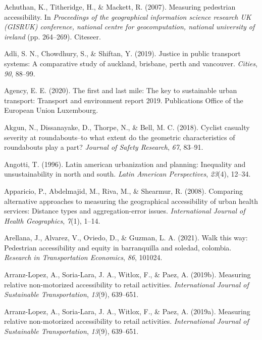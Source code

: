 \documentclass[
11pt, %
oneside, %
english, %
singlespacing, %
]{macthesis} %
\newlength{\cslhangindent}
\newenvironment{CSLReferences}[2] %
{\begin{list}{}{%
	\setlength{\itemindent}{0pt}
	\setlength{\leftmargin}{0pt}
	\setlength{\parsep}{0pt}
	\ifodd #1
	\setlength{\leftmargin}{\cslhangindent}
	\setlength{\itemindent}{-1\cslhangindent}
	\fi
	\setlength{\itemsep}{#2\baselineskip}}}
{\end{list}}
\begin{document}
\label{refs}
\begin{CSLReferences}{1}{0}
Achuthan, K., Titheridge, H., \& Mackett, R. (2007). Measuring pedestrian accessibility. In \emph{Proceedings of the geographical information science research UK (GISRUK) conference, national centre for geocomputation, national university of ireland} (pp. 264--269). Citeseer.

Adli, S. N., Chowdhury, S., \& Shiftan, Y. (2019). Justice in public transport systems: A comparative study of auckland, brisbane, perth and vancouver. \emph{Cities}, \emph{90}, 88--99.

Agency, E. E. (2020). The first and last mile: The key to sustainable urban transport: Transport and environment report 2019. Publications Office of the European Union Luxembourg.

Akgun, N., Dissanayake, D., Thorpe, N., \& Bell, M. C. (2018). Cyclist casualty severity at roundabouts--to what extent do the geometric characteristics of roundabouts play a part? \emph{Journal of Safety Research}, \emph{67}, 83--91.

Angotti, T. (1996). Latin american urbanization and planning: Inequality and unsustainability in north and south. \emph{Latin American Perspectives}, \emph{23}(4), 12--34.

Apparicio, P., Abdelmajid, M., Riva, M., \& Shearmur, R. (2008). Comparing alternative approaches to measuring the geographical accessibility of urban health services: Distance types and aggregation-error issues. \emph{International Journal of Health Geographics}, \emph{7}(1), 1--14.

Arellana, J., Alvarez, V., Oviedo, D., \& Guzman, L. A. (2021). Walk this way: Pedestrian accessibility and equity in barranquilla and soledad, colombia. \emph{Research in Transportation Economics}, \emph{86}, 101024.

Arranz-Lopez, A., Soria-Lara, J. A., Witlox, F., \& Paez, A. (2019b). Measuring relative non-motorized accessibility to retail activities. \emph{International Journal of Sustainable Transportation}, \emph{13}(9), 639--651.

Arranz-Lopez, A., Soria-Lara, J. A., Witlox, F., \& Paez, A. (2019a). Measuring relative non-motorized accessibility to retail activities. \emph{International Journal of Sustainable Transportation}, \emph{13}(9), 639--651.


\end{CSLReferences}
\end{document}
